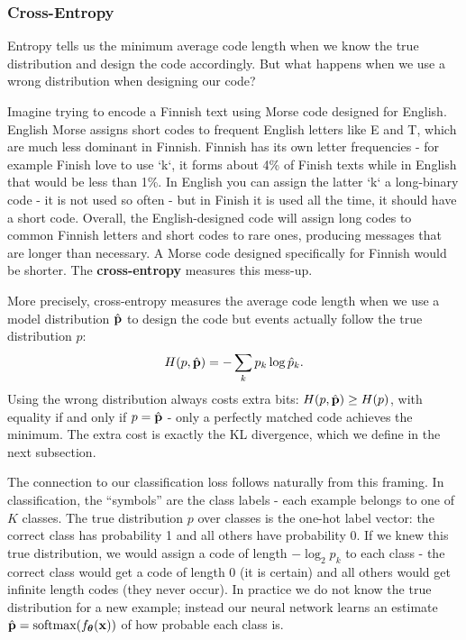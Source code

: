 \subsubsection{Cross-Entropy}

Entropy tells us the minimum average code length when we know the true distribution and design the code accordingly. But what happens when we use a wrong distribution when designing our code?

Imagine trying to encode a Finnish text using Morse code designed for English. English Morse assigns short codes to frequent English letters like E and T, which are much less dominant in Finnish. Finnish has its own letter frequencies - for example Finish love to use `k`, it forms about 4\% of Finish texts while in English that would be less than 1\%. In English you can assign the latter `k` a long-binary code - it is not used so often - but in Finish it is used all the time, it should have a short code. Overall, the English-designed code will assign long codes to common Finnish letters and short codes to rare ones, producing messages that are longer than necessary. A Morse code designed specifically for Finnish would be shorter. The \textbf{cross-entropy} measures this mess-up.

More precisely, cross-entropy measures the average code length when we use a model distribution $\hat{\mathbf{p}}$ to design the code but events actually follow the true distribution $p$:
\begin{equation}
    H(p, \hat{\mathbf{p}}) = -\sum_k p_k \log \hat{p}_k.
\end{equation}
Using the wrong distribution always costs extra bits: $H(p, \hat{\mathbf{p}}) \geq H(p)$, with equality if and only if $p = \hat{\mathbf{p}}$ - only a perfectly matched code achieves the minimum. The extra cost is exactly the KL divergence, which we define in the next subsection.

The connection to our classification loss follows naturally from this framing. In classification, the ``symbols'' are the class labels - each example belongs to one of $K$ classes. The true distribution $p$ over classes is the one-hot label vector: the correct class has probability 1 and all others have probability 0. If we knew this true distribution, we would assign a code of length $-\log_2 p_k$ to each class - the correct class would get a code of length 0 (it is certain) and all others would get infinite length codes (they never occur). In practice we do not know the true distribution for a new example; instead our neural network learns an estimate $\hat{\mathbf{p}} = \text{softmax}(f_{\boldsymbol{\theta}}(\mathbf{x}))$ of how probable each class is.

